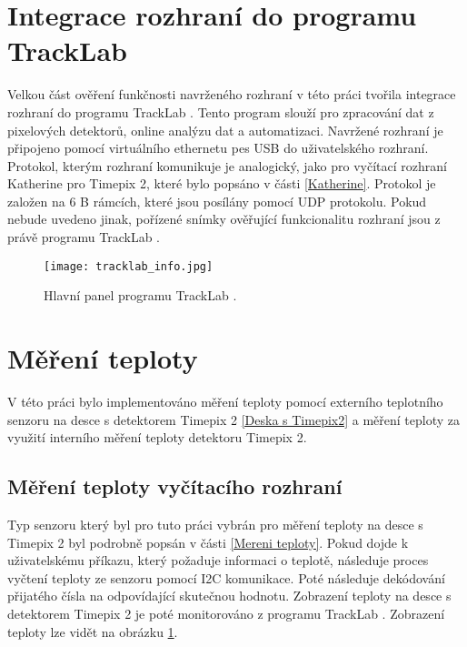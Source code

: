 \section{Integrace rozhraní do programu TrackLab}
Velkou část ověření funkčnosti navrženého rozhraní v této práci tvořila integrace rozhraní do programu TrackLab \cite{Manek_2024}. Tento program slouží pro zpracování dat z pixelových detektorů, online analýzu dat a automatizaci. Navržené rozhraní je připojeno pomocí virtuálního ethernetu pes USB do uživatelského rozhraní. Protokol, kterým rozhraní komunikuje je analogický, jako pro vyčítací rozhraní Katherine pro Timepix 2, které bylo popsáno v části \ref{Katherine}. Protokol je založen na 6 B rámcích, které jsou posílány pomocí UDP protokolu. Pokud nebude uvedeno jinak, pořízené snímky ověřující funkcionalitu rozhraní jsou z právě programu TrackLab \cite{Manek_2024}.

\begin{figure}[h!]
	\centering
	\captionsetup{justification=centering}
	\texttt{[image: tracklab\_info.jpg]}
	\caption{Hlavní panel programu TrackLab \cite{Manek_2024}.} 
	\label{fig:Tracklab}
\end{figure}

\section{Měření teploty}
V této práci bylo implementováno měření teploty pomocí externího teplotního senzoru na desce s detektorem Timepix 2 \ref{Deska s Timepix2} a měření teploty za využití interního měření teploty detektoru Timepix 2.
\subsection{Měření teploty vyčítacího rozhraní}
Typ senzoru který byl pro tuto práci vybrán pro měření teploty na desce s Timepix 2 byl podrobně popsán v části \ref{Mereni teploty}. Pokud dojde k uživatelskému příkazu, který požaduje informaci o teplotě, následuje proces vyčtení teploty ze senzoru pomocí I2C komunikace. Poté následuje dekódování přijatého čísla na odpovídající skutečnou hodnotu. Zobrazení teploty na desce s detektorem Timepix 2 je poté monitorováno z programu TrackLab \cite{Manek_2024}. Zobrazení teploty lze vidět na obrázku \ref{fig:Tracklab}.
